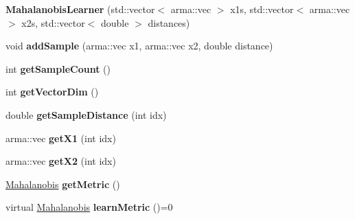 \begin{DoxyCompactItemize}
\item 
{\bfseries Mahalanobis\+Learner} (std\+::vector$<$ arma\+::vec $>$ x1s, std\+::vector$<$ arma\+::vec $>$ x2s, std\+::vector$<$ double $>$ distances)\hypertarget{classkukadu_1_1MahalanobisLearner_a9f9d3dffef0fad99e19e54e4ce99e9d2}{}\label{classkukadu_1_1MahalanobisLearner_a9f9d3dffef0fad99e19e54e4ce99e9d2}

\item 
void {\bfseries add\+Sample} (arma\+::vec x1, arma\+::vec x2, double distance)\hypertarget{classkukadu_1_1MahalanobisLearner_a4f3b38ac5088b27d34a2bc8200aa8dce}{}\label{classkukadu_1_1MahalanobisLearner_a4f3b38ac5088b27d34a2bc8200aa8dce}

\item 
int {\bfseries get\+Sample\+Count} ()\hypertarget{classkukadu_1_1MahalanobisLearner_af57c5d3f3876acc201e923a55db342ca}{}\label{classkukadu_1_1MahalanobisLearner_af57c5d3f3876acc201e923a55db342ca}

\item 
int {\bfseries get\+Vector\+Dim} ()\hypertarget{classkukadu_1_1MahalanobisLearner_a24d0f7f9e43d297454aa316f80019e15}{}\label{classkukadu_1_1MahalanobisLearner_a24d0f7f9e43d297454aa316f80019e15}

\item 
double {\bfseries get\+Sample\+Distance} (int idx)\hypertarget{classkukadu_1_1MahalanobisLearner_aeb08af8a9bbf6d482a7bbdb1c34e933b}{}\label{classkukadu_1_1MahalanobisLearner_aeb08af8a9bbf6d482a7bbdb1c34e933b}

\item 
arma\+::vec {\bfseries get\+X1} (int idx)\hypertarget{classkukadu_1_1MahalanobisLearner_ac552c824300edabfc56f097f8adfea4a}{}\label{classkukadu_1_1MahalanobisLearner_ac552c824300edabfc56f097f8adfea4a}

\item 
arma\+::vec {\bfseries get\+X2} (int idx)\hypertarget{classkukadu_1_1MahalanobisLearner_a43027e86750acf224b07edbe63514a2b}{}\label{classkukadu_1_1MahalanobisLearner_a43027e86750acf224b07edbe63514a2b}

\item 
\hyperlink{classkukadu_1_1Mahalanobis}{Mahalanobis} {\bfseries get\+Metric} ()\hypertarget{classkukadu_1_1MahalanobisLearner_a66f0a4fbe1aef2a2eb8434552fe6a556}{}\label{classkukadu_1_1MahalanobisLearner_a66f0a4fbe1aef2a2eb8434552fe6a556}

\item 
virtual \hyperlink{classkukadu_1_1Mahalanobis}{Mahalanobis} {\bfseries learn\+Metric} ()=0\hypertarget{classkukadu_1_1MahalanobisLearner_a05b61576c302b5484bc1a482968c01a0}{}\label{classkukadu_1_1MahalanobisLearner_a05b61576c302b5484bc1a482968c01a0}

\end{DoxyCompactItemize}
